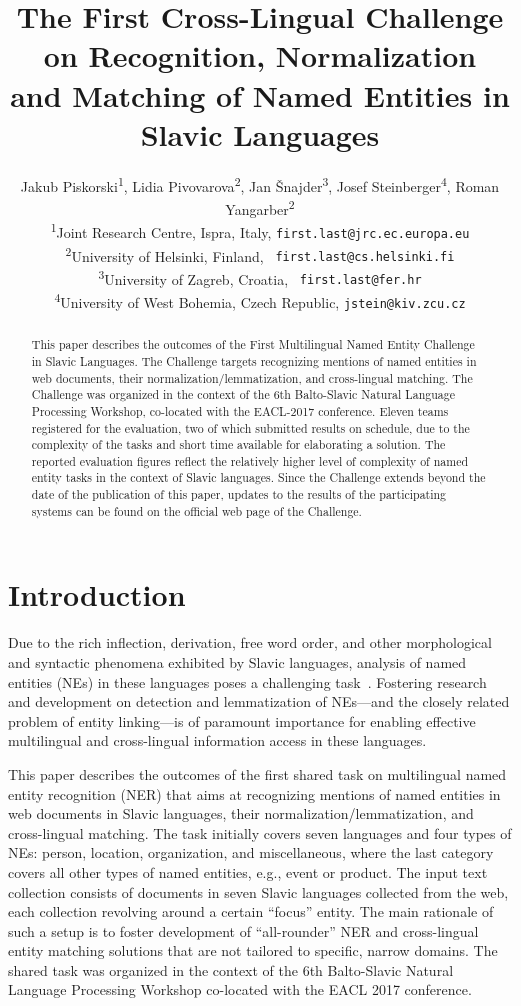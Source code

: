 \documentclass[11pt]{article}
\title{The First Cross-Lingual Challenge on Recognition,
  Normalization
  \\ and Matching of Named Entities in Slavic Languages}
\author{Jakub Piskorski\textsuperscript{1},
  Lidia Pivovarova\textsuperscript{2},
  Jan Šnajder\textsuperscript{3},
  Josef Steinberger\textsuperscript{4},
  Roman Yangarber\textsuperscript{2} \\
  \textsuperscript{1}Joint Research Centre,
  \comment{Via Enrico Fermi 2749, 21027}Ispra\comment{ (VA)}, Italy,
  {\small \tt first.last@jrc.ec.europa.eu} \\
  \textsuperscript{2}University of Helsinki, Finland, {\small \tt
  first.last@cs.helsinki.fi}\\
    \textsuperscript{3}University of Zagreb, Croatia, {\small \tt
    first.last@fer.hr} \\
  \textsuperscript{4}University of West Bohemia, Czech Republic, 
  {\small \tt jstein@kiv.zcu.cz} 
  }
\date{}
\begin{document}
\maketitle
\begin{abstract}

  This paper describes the outcomes of the First Multilingual Named Entity Challenge in Slavic
  Languages.  The Challenge targets recognizing mentions of named entities in web documents,
  their normalization/lemmatization, and cross-lingual matching.  The Challenge was organized
  in the context of the 6th Balto-Slavic Natural Language Processing Workshop, co-located with
  the EACL-2017 conference.  Eleven teams registered for the evaluation, two of which
  submitted results on schedule, due to the complexity of the tasks and short time available
  for elaborating a solution.  The reported evaluation figures reflect the relatively higher
  level of complexity of named entity tasks in the context of Slavic languages.  Since the
  Challenge extends beyond the date of the publication of this paper, updates to the results
  of the participating systems can be found on the official web page of the Challenge.

\end{abstract}

\section{Introduction}
\label{sec:intro}

Due to the rich inflection, derivation, free word order, and other morphological and syntactic
phenomena exhibited by Slavic languages, analysis of named entities (NEs) in these languages
poses a challenging
task~\cite{Przepiorkowski:2007:SIE:1567545.1567547,journals/ir/PiskorskiWS09}.  Fostering
research and development on detection and lemmatization of NEs---and the closely related
problem of entity linking---is of paramount importance for enabling effective multilingual and
cross-lingual information access in these languages.

This paper describes the outcomes of the first shared task on multilingual named entity
recognition {(NER)} that aims at recognizing mentions of named entities in web documents in
Slavic languages, their normalization/lemmatization, and cross-lingual matching.  The task
initially covers seven languages and four types of NEs: person, location, organization, and
miscellaneous, where the last category covers all other types of named entities, e.g., event
or product.  The input text collection consists of documents in {seven Slavic languages}
collected from the web, each collection revolving around a certain ``focus'' entity.  The main
rationale of such a setup is to foster development of ``all-rounder'' NER and cross-lingual
entity matching solutions that are not tailored to specific, narrow domains.  The shared task
was organized in the context of the 6th Balto-Slavic Natural Language Processing Workshop
co-located with the EACL 2017 conference.
\end{document}
